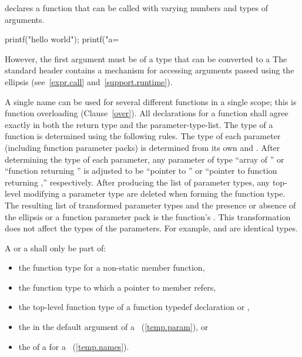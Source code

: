 declares a function that can be called with varying numbers and types of arguments.

\begin{codeblock}
printf("hello world");
printf("a=%
\end{codeblock}

However, the first argument must be of a type
that can be converted to a
\exitexample
\enternote
The standard header
%
contains a mechanism for accessing arguments passed using the ellipsis
(see~\ref{expr.call} and~\ref{support.runtime}).
\exitnote

\pnum
{}%
%
A single name can be used for several different functions in a single scope;
this is function overloading (Clause~\ref{over}).
All declarations for a function shall agree exactly
in both the return type and the parameter-type-list.
The type of a function is determined using the following rules.
The type of each parameter (including function parameter packs) is
determined from its own
and
.
After determining the type of each parameter, any parameter of type ``array of
%
%
''
%
%
or ``function returning
''
is adjusted to be ``pointer to
''
or ``pointer to function returning
,''
respectively.
After producing the list of parameter types,
any top-level
modifying a parameter type are deleted
when forming the function type.
The resulting list of transformed parameter types
and the presence or absence of the ellipsis or a function parameter pack
is the function's
.
\enternote This transformation does not affect the types of the parameters.
For example,  and
 are identical types. \exitnote

\pnum
A
or a 
shall only be part of:
\begin{itemize}
\item the function type for a non-static member function,

\item the function type to which a pointer to member refers,

\item the top-level function type of a function typedef declaration
or ,

\item the  in the default argument of a
~(\ref{temp.param}), or

\item the  of a  for a
~(\ref{temp.names}).
\end{itemize}

